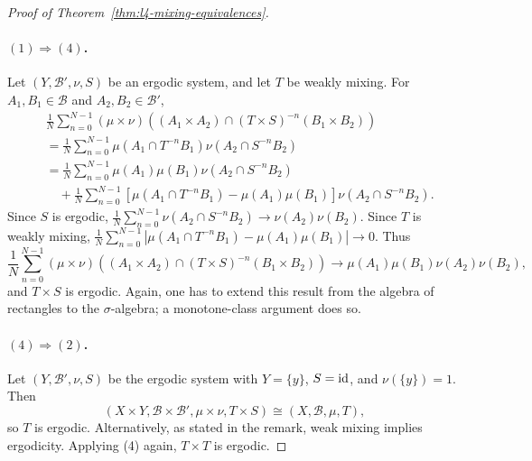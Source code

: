 \documentclass[11pt,a4paper]{article}
\begin{document}
\begin{proof}[Proof of Theorem~\ref{thm:l4-mixing-equivalences}]
\paragraph{$(1)\Longrightarrow(4)$.}
Let $(Y,\mathcal B',\nu,S)$ be an ergodic system, and let $T$ be weakly
mixing. For $A_1,B_1\in\mathcal B$ and $A_2,B_2\in\mathcal B'$,
\[
 \begin{aligned}
 &\frac1N\sum_{n=0}^{N-1}(\mu\times\nu)
 ((A_1\times A_2)\cap(T\times S)^{-n}(B_1\times B_2))\\
 &=\frac1N\sum_{n=0}^{N-1}\mu(A_1\cap T^{-n}B_1)\nu(A_2\cap S^{-n}B_2)\\
 &=\frac1N\sum_{n=0}^{N-1}\mu(A_1)\mu(B_1)\nu(A_2\cap S^{-n}B_2)\\
 &\quad+\frac1N\sum_{n=0}^{N-1}
 [\mu(A_1\cap T^{-n}B_1)-\mu(A_1)\mu(B_1)]\nu(A_2\cap S^{-n}B_2).
 \end{aligned}
\]
Since $S$ is ergodic,
$\frac1N\sum_{n=0}^{N-1}\nu(A_2\cap S^{-n}B_2)\to\nu(A_2)\nu(B_2)$.
Since $T$ is weakly mixing,
$\frac1N\sum_{n=0}^{N-1}|\mu(A_1\cap T^{-n}B_1)-\mu(A_1)\mu(B_1)|\to0$.
Thus
\[
 \frac1N\sum_{n=0}^{N-1}(\mu\times\nu)
 ((A_1\times A_2)\cap(T\times S)^{-n}(B_1\times B_2))
 \longrightarrow\mu(A_1)\mu(B_1)\nu(A_2)\nu(B_2),
\]
and $T\times S$ is ergodic. Again, one has to extend this result from the
algebra of rectangles to the $\sigma$-algebra; a monotone-class argument does
so.

\paragraph{$(4)\Longrightarrow(2)$.}
Let $(Y,\mathcal B',\nu,S)$ be the ergodic system with $Y=\{y\}$,
$S=\operatorname{id}$, and $\nu(\{y\})=1$.
Then
\[
 (X\times Y,\mathcal B\times\mathcal B',\mu\times\nu,T\times S)
 \cong(X,\mathcal B,\mu,T),
\]
so $T$ is ergodic. Alternatively, as stated in the remark, weak mixing
implies ergodicity. Applying (4) again, $T\times T$ is ergodic.


\end{proof}
\end{document}
